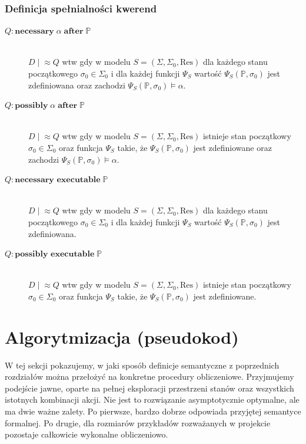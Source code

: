 \documentclass[11pt,a4paper]{article}
\theoremstyle{definition}
\begin{document}
\subsubsection*{Definicja spełnialności kwerend}
\begin{description}
    \item[$Q: \textbf{necessary}\; \alpha \;\textbf{after}\; \mathbb{P}$] \hfill \\
        $D \mid \! \approx Q$ wtw gdy w modelu $S = (\Sigma, \Sigma_0, \mathrm{Res})$ dla każdego stanu początkowego $\sigma_0 \in \Sigma_0$ i dla każdej funkcji $\Psi_S$ wartość $\Psi_S(\mathbb{P}, \sigma_0)$ jest zdefiniowana oraz zachodzi $\Psi_S(\mathbb{P}, \sigma_0) \models \alpha$.
    \item[$Q: \textbf{possibly}\; \alpha \;\textbf{after}\; \mathbb{P}$] \hfill \\
        $D \mid \! \approx Q$ wtw gdy w modelu $S = (\Sigma, \Sigma_0, \mathrm{Res})$ istnieje stan początkowy $\sigma_0 \in \Sigma_0$ oraz funkcja $\Psi_S$ takie, że $\Psi_S(\mathbb{P}, \sigma_0)$ jest zdefiniowane oraz zachodzi $\Psi_S(\mathbb{P}, \sigma_0) \models \alpha$.
    \item[$Q: \textbf{necessary executable}\; \mathbb{P}$] \hfill \\
        $D \mid \! \approx Q$ wtw gdy w modelu $S = (\Sigma, \Sigma_0, \mathrm{Res})$ dla każdego stanu początkowego $\sigma_0 \in \Sigma_0$ i dla każdej funkcji $\Psi_S$ wartość $\Psi_S(\mathbb{P}, \sigma_0)$ jest zdefiniowana.
    \item[$Q: \textbf{possibly executable}\; \mathbb{P}$] \hfill \\
        $D \mid \! \approx Q$ wtw gdy w modelu $S = (\Sigma, \Sigma_0, \mathrm{Res})$ istnieje stan początkowy $\sigma_0 \in \Sigma_0$ oraz funkcja $\Psi_S$ takie, że $\Psi_S(\mathbb{P}, \sigma_0)$ jest zdefiniowane.
\end{description}
\section{Algorytmizacja (pseudokod)}

W tej sekcji pokazujemy, w jaki sposób definicje semantyczne z poprzednich rozdziałów można przełożyć na konkretne procedury obliczeniowe. Przyjmujemy podejście jawne, oparte na pełnej eksploracji przestrzeni stanów oraz wszystkich istotnych kombinacji akcji. Nie jest to rozwiązanie asymptotycznie optymalne, ale ma dwie ważne zalety. Po pierwsze, bardzo dobrze odpowiada przyjętej semantyce formalnej. Po drugie, dla rozmiarów przykładów rozważanych w projekcie pozostaje całkowicie wykonalne obliczeniowo.
\end{document}
